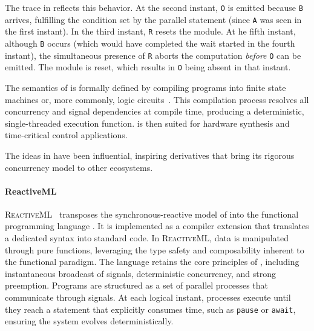The trace in  reflects this behavior. At the second instant,
\texttt{O} is emitted because \texttt{B} arrives, fulfilling the condition set by the parallel
statement (since \texttt{A} was seen in the first instant). In the third instant, \texttt{R} resets
the module. At he fifth instant, although \texttt{B} occurs (which would have completed the wait
started in the fourth instant), the simultaneous presence of \texttt{R} aborts the computation
\emph{before} \texttt{O} can be emitted. The module is reset, which results in \texttt{O} being
absent in that instant.

The semantics of \Esterel is formally defined by compiling programs into finite state machines or,
more commonly, logic circuits~\cite{DBLP:books/daglib/0023221}. This compilation process resolves
all concurrency and signal dependencies at compile time, producing a deterministic, single-threaded
execution function. \Esterel is then suited for hardware synthesis and time-critical control
applications.

\smallskip

The ideas in \Esterel have been influential, inspiring derivatives that bring its rigorous
concurrency model to other ecosystems.

\paragraph*{ReactiveML}
\textsc{ReactiveML}~\cite{DBLP:conf/ppdp/MandelP05} transposes the synchronous-reactive model of
\Esterel into the functional programming language \Caml. It is implemented as a compiler extension
that translates a dedicated syntax into standard \Caml code. In \textsc{ReactiveML}, data is
manipulated through pure functions, leveraging the type safety and composability inherent to the
functional paradigm. The language retains the core principles of \Esterel, including instantaneous
broadcast of signals, deterministic concurrency, and strong preemption. Programs are structured as a
set of parallel processes that communicate through signals. At each logical instant, processes
execute until they reach a statement that explicitly consumes time, such as \texttt{pause} or
\texttt{await}, ensuring the system evolves deterministically.

